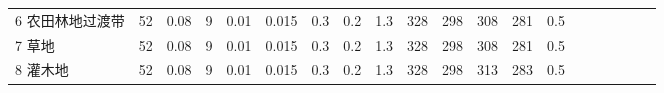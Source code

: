 \begin{landscape}
\begin{table}[htbp]
\begin{tabular}{@{}lccccccccccccccccccc@{}}
    6 农田林地过渡带      & 52                                                                & 0.08                                                                                                   & 9                                                                                  & 0.01                                                                               & 0.015                                                               & 0.3                                                       & 0.2                                                       & 1.3                                                       & 328                                                             & 298                                                             & 308                                                              & 281                                                               & 0.5                                                          \\
    7 草地           & 52                                                                & 0.08                                                                                                   & 9                                                                                  & 0.01                                                                               & 0.015                                                               & 0.3                                                       & 0.2                                                       & 1.3                                                       & 328                                                             & 298                                                             & 308                                                              & 281                                                               & 0.5                                                          \\
    8 灌木地          & 52                                                                & 0.08                                                                                                   & 9                                                                                  & 0.01                                                                               & 0.015                                                               & 0.3                                                       & 0.2                                                       & 1.3                                                       & 328                                                             & 298                                                             & 313                                                              & 283                                                               & 0.5                                                          \\

\end{tabular}
\end{table}
\end{landscape}
